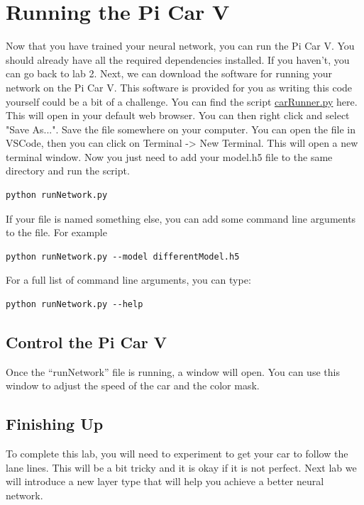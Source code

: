 \documentclass[11pt]{report}
\begin{document}
\pagebreak

\chapter{Running the Pi Car V} 
Now that you have trained your neural network, you can run the Pi Car V. You should already have all the required dependencies installed. If you haven't, you can go back to lab 2.
Next, we can download the software for running your network on the Pi Car V. This software is provided for you as writing this code yourself could be a bit of a challenge. You can find the script
\href{https://raw.githubusercontent.com/PiCarV/CarRunner/main/carRunner.py}{carRunner.py} here. This will open in your default web browser. You can then right click and select "Save As...". Save the file somewhere on your computer.
You can open the file in VSCode, then you can click on Terminal -> New Terminal. This will open a new terminal window. Now you just need to add your model.h5 file to the same directory and run the script.
\begin{verbatim}
python runNetwork.py
\end{verbatim}
If your file is named something else, you can add some command line arguments to the file. For example
\begin{verbatim}
python runNetwork.py --model differentModel.h5    
\end{verbatim}
For a full list of command line arguments, you can type: 
\begin{verbatim}
python runNetwork.py --help
\end{verbatim}
\section{Control the Pi Car V}
Once the “runNetwork” file is running, a window will open. You can use this window to adjust the speed of the car and the color mask.

\section{Finishing Up}
To complete this lab, you will need to experiment to get your car to follow the lane lines. This will be a bit tricky and it is okay if it is not perfect. Next lab we will introduce a new layer type that will help you achieve a better neural network.
\end{document}
